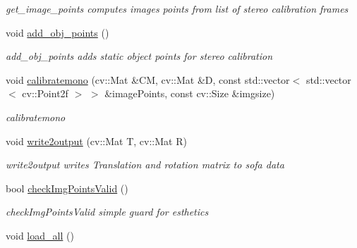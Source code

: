 \begin{DoxyCompactItemize}
\begin{DoxyCompactList}\small\item\em get\+\_\+image\+\_\+points computes images points from list of stereo calibration frames \end{DoxyCompactList}\item 
\mbox{\label{classsofa_1_1rgbdtracking_1_1_multi_cam_calibrator_aa9bd50057bc3e8ae2300f2d3f370f81e}} 
void \hyperlink{classsofa_1_1rgbdtracking_1_1_multi_cam_calibrator_aa9bd50057bc3e8ae2300f2d3f370f81e}{add\+\_\+obj\+\_\+points} ()
\begin{DoxyCompactList}\small\item\em add\+\_\+obj\+\_\+points adds static object points for stereo calibration \end{DoxyCompactList}\item 
void \hyperlink{classsofa_1_1rgbdtracking_1_1_multi_cam_calibrator_adc2012d92a9088f490ae73aff4da67a8}{calibratemono} (cv\+::\+Mat \&CM, cv\+::\+Mat \&D, const std\+::vector$<$ std\+::vector$<$ cv\+::\+Point2f $>$ $>$ \&image\+Points, const cv\+::\+Size \&imgsize)
\begin{DoxyCompactList}\small\item\em calibratemono \end{DoxyCompactList}\item 
void \hyperlink{classsofa_1_1rgbdtracking_1_1_multi_cam_calibrator_ae08d1a20d3ceb8e33a1d1a99365e1187}{write2output} (cv\+::\+Mat T, cv\+::\+Mat R)
\begin{DoxyCompactList}\small\item\em write2output writes Translation and rotation matrix to sofa data \end{DoxyCompactList}\item 
bool \hyperlink{classsofa_1_1rgbdtracking_1_1_multi_cam_calibrator_a837bc9cd6cc234bee5a9bde7bca5e3d6}{check\+Img\+Points\+Valid} ()
\begin{DoxyCompactList}\small\item\em check\+Img\+Points\+Valid simple guard for esthetics \end{DoxyCompactList}\item 
\mbox{\label{classsofa_1_1rgbdtracking_1_1_multi_cam_calibrator_a589e7638f8f213616affc2e7abcfb407}} 
void \hyperlink{classsofa_1_1rgbdtracking_1_1_multi_cam_calibrator_a589e7638f8f213616affc2e7abcfb407}{load\+\_\+all} ()

\end{DoxyCompactItemize}
